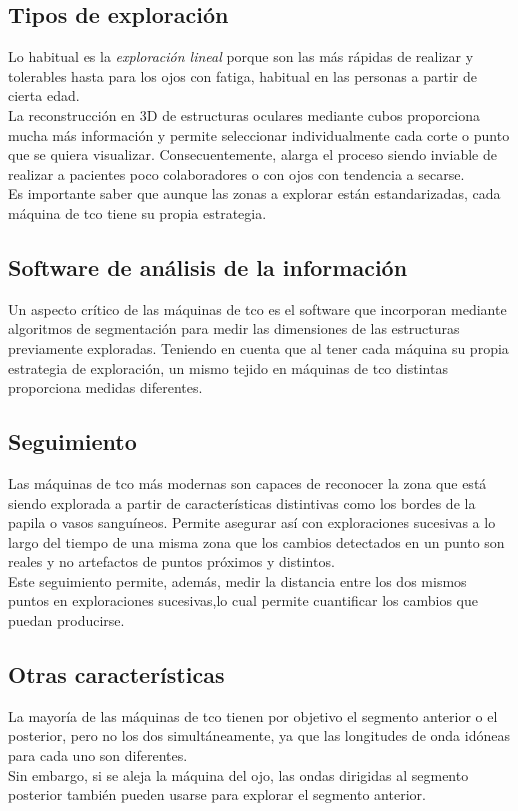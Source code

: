 \subsection{Tipos de exploración}
Lo habitual es la \emph{exploración lineal} porque son las más rápidas
de realizar y tolerables hasta para los ojos con
fatiga, habitual en las personas a partir de cierta edad.\\
La reconstrucción en 3D de estructuras oculares mediante cubos
proporciona mucha más información y permite seleccionar
individualmente cada corte o punto que se quiera
visualizar. Consecuentemente, alarga el proceso siendo inviable de
realizar a pacientes poco colaboradores o con ojos con tendencia a
secarse.\\
Es importante saber que aunque las zonas a explorar están
estandarizadas, cada máquina de \gls{tco} tiene su propia estrategia.

\subsection{Software de análisis de la información}
Un aspecto crítico de las máquinas de \gls{tco} es el software que
incorporan mediante algoritmos de segmentación para medir las
dimensiones de las estructuras previamente exploradas. Teniendo en
cuenta que al tener cada máquina su propia estrategia de exploración,
un mismo tejido en máquinas de \gls{tco} distintas proporciona medidas
diferentes.

\subsection{Seguimiento}
Las máquinas de \gls{tco} más modernas son capaces de reconocer la
zona que está siendo explorada a partir de características distintivas
como los bordes de la papila o vasos sanguíneos. Permite asegurar así
con exploraciones sucesivas a lo largo del tiempo de una misma zona
que los cambios detectados en un punto son reales y no artefactos de
puntos próximos y distintos.\\
Este seguimiento permite, además, medir la distancia entre los dos
mismos puntos en exploraciones sucesivas,lo cual permite cuantificar
los cambios que puedan producirse.

\subsection{Otras características}
La mayoría de las máquinas de \gls{tco} tienen por objetivo el
segmento anterior o el posterior, pero no los dos simultáneamente, ya
que
las longitudes de onda idóneas para cada uno son diferentes.\\
Sin embargo, si se aleja la máquina del ojo, las ondas dirigidas al
segmento posterior también pueden usarse para explorar el segmento
anterior.

